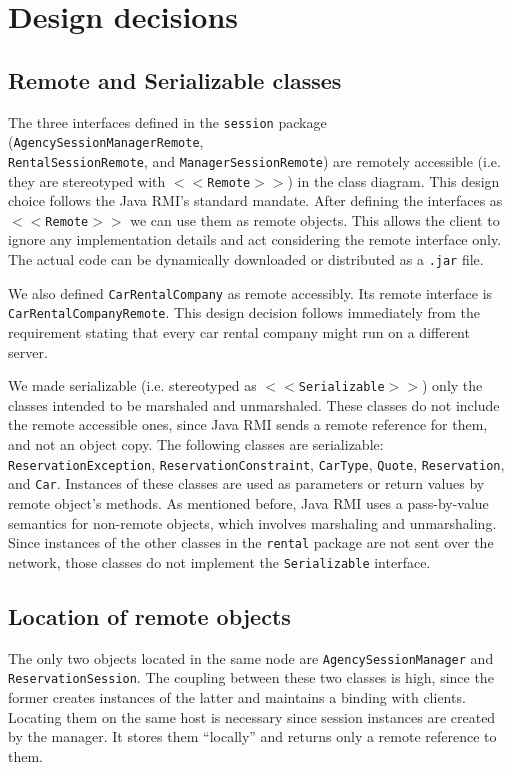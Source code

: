 \section{Design decisions}
\subsection{Remote and Serializable classes}
The three interfaces defined in the \texttt{session} package (\texttt{AgencySessionManagerRemote}, \\\texttt{RentalSessionRemote}, and \texttt{ManagerSessionRemote}) are remotely accessible (i.e. they are stereotyped with \texttt{$<<$Remote$>>$}) in the class diagram. This design choice follows the Java RMI's standard mandate. After defining the interfaces as \texttt{$<<$Remote$>>$} we can use them as remote objects. This allows the client to ignore any implementation details and act considering the remote interface only. The actual code can be dynamically downloaded or distributed as a \texttt{.jar} file.

We also defined \texttt{CarRentalCompany} as remote accessibly. Its remote interface is \\\texttt{CarRentalCompanyRemote}. This design decision follows immediately from the requirement stating that every car rental company might run on a different server. 

We made serializable (i.e. stereotyped as \texttt{$<<$Serializable$>>$}) only the classes intended to be marshaled and unmarshaled. These classes do not include the remote accessible ones, since Java RMI sends a remote reference for them, and not an object copy. The following classes are serializable: \texttt{ReservationException}, \texttt{ReservationConstraint}, \texttt{CarType}, \texttt{Quote}, \texttt{Reservation}, and \texttt{Car}. Instances of these classes are used as parameters or return values by remote object's methods. As mentioned before, Java RMI uses a pass-by-value semantics for non-remote objects, which involves marshaling and unmarshaling. Since instances of the other classes in the \texttt{rental} package are not sent over the network, those classes do not implement the \texttt{Serializable} interface. 

\subsection{Location of remote objects}
The only two objects located in the same node are \texttt{AgencySessionManager} and \texttt{ReservationSession}. The coupling between these two classes is high, since the former creates instances of the latter and maintains a binding with clients. Locating them on the same host is necessary since session instances are created by the manager. It stores them ``locally'' and returns only a remote reference to them. 

